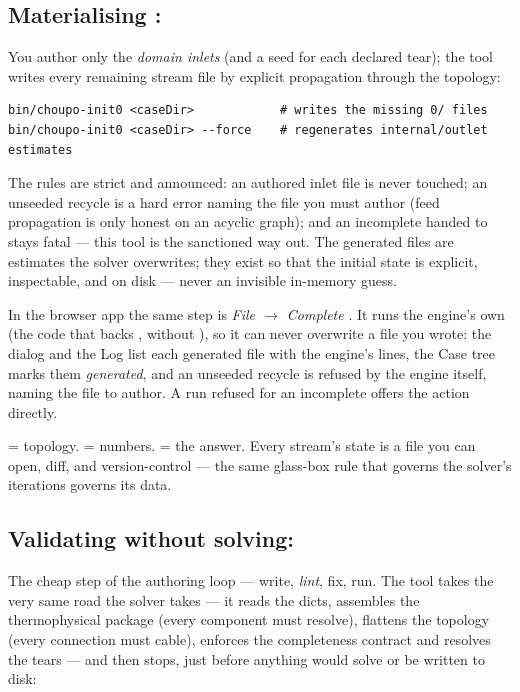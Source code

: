 \documentclass[11pt,a4paper]{article}
\begin{document}
\subsection{Materialising : }\label{sec:init0}

You author only the \emph{domain inlets} (and a seed for each declared
tear); the tool writes every remaining stream file by explicit
propagation through the topology:

\begin{lstlisting}
bin/choupo-init0 <caseDir>            # writes the missing 0/ files
bin/choupo-init0 <caseDir> --force    # regenerates internal/outlet estimates
\end{lstlisting}

The rules are strict and announced: an authored inlet file is never
touched; an unseeded recycle is a hard error naming the file you must
author (feed propagation is only honest on an acyclic graph); and an
incomplete  handed to  stays fatal --- this
tool is the sanctioned way out.  The generated files are estimates the
solver overwrites; they exist so that the initial state is explicit,
inspectable, and on disk --- never an invisible in-memory guess.

In the browser app the same step is \emph{File $\rightarrow$ Complete
}.  It runs the engine's own  (the code that backs
, without ), so it can never
overwrite a file you wrote: the dialog and the Log list each generated
file with the engine's \code{[init0]} lines, the Case tree marks them
\emph{generated}, and an unseeded recycle is refused by the engine itself,
naming the file to author.  A run refused for an incomplete 
offers the action directly.

\begin{keyidea}
 = topology.   = numbers.
 = the answer.  Every stream's state is a file you can
open, diff, and version-control --- the same glass-box rule that governs
the solver's iterations governs its data.
\end{keyidea}

\subsection{Validating without solving: }\label{sec:lint}

The cheap step of the authoring loop --- write, \emph{lint}, fix, run.
The tool takes the very same road the solver takes --- it reads the
dicts, assembles the thermophysical package (every component must
resolve), flattens the topology (every connection must cable), enforces
the  completeness contract and resolves the tears --- and then
stops, just before anything would solve or be written to disk:
\end{document}
